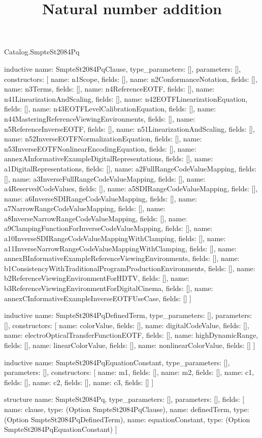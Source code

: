 \begin{lexlean}{Catalog.SmpteSt2084Pq}
\title{Natural number addition}
\begin{semanticmodule}
inductive{
  name: SmpteSt2084PqClause,
  type_parameters: [],
  parameters: [],
  constructors: [
    {name: n1Scope, fields: []},
    {name: n2ConformanceNotation, fields: []},
    {name: n3Terms, fields: []},
    {name: n4ReferenceEOTF, fields: []},
    {name: n41LinearizationAndScaling, fields: []},
    {name: n42EOTFLinearizationEquation, fields: []},
    {name: n43EOTFLevelCalibrationEquation, fields: []},
    {name: n44MasteringReferenceViewingEnvironments, fields: []},
    {name: n5ReferenceInverseEOTF, fields: []},
    {name: n51LinearizationAndScaling, fields: []},
    {name: n52InverseEOTFNormalizationEquation, fields: []},
    {name: n53InverseEOTFNonlinearEncodingEquation, fields: []},
    {name: annexAInformativeExampleDigitalRepresentations, fields: []},
    {name: a1DigitalRepresentations, fields: []},
    {name: a2FullRangeCodeValueMapping, fields: []},
    {name: a3InverseFullRangeCodeValueMapping, fields: []},
    {name: a4ReservedCodeValues, fields: []},
    {name: a5SDIRangeCodeValueMapping, fields: []},
    {name: a6InverseSDIRangeCodeValueMapping, fields: []},
    {name: a7NarrowRangeCodeValueMapping, fields: []},
    {name: a8InverseNarrowRangeCodeValueMapping, fields: []},
    {name: a9ClampingFunctionForInverseCodeValueMapping, fields: []},
    {name: a10InverseSDIRangeCodeValueMappingWithClamping, fields: []},
    {name: a11InverseNarrowRangeCodeValueMappingWithClamping, fields: []},
    {name: annexBInformativeExampleReferenceViewingEnvironments, fields: []},
    {name: b1ConsistencyWithTraditionalProgramProductionEnvironments, fields: []},
    {name: b2ReferenceViewingEnvironmentForHDTV, fields: []},
    {name: b3ReferenceViewingEnvironmentForDigitalCinema, fields: []},
    {name: annexCInformativeExampleInverseEOTFUseCase, fields: []}
  ]
}

inductive{
  name: SmpteSt2084PqDefinedTerm,
  type_parameters: [],
  parameters: [],
  constructors: [
    {name: colorValue, fields: []},
    {name: digitalCodeValue, fields: []},
    {name: electroOpticalTransferFunctionEOTF, fields: []},
    {name: highDynamicRange, fields: []},
    {name: linearColorValue, fields: []},
    {name: nonlinearColorValue, fields: []}
  ]
}

inductive{
  name: SmpteSt2084PqEquationConstant,
  type_parameters: [],
  parameters: [],
  constructors: [
    {name: m1, fields: []},
    {name: m2, fields: []},
    {name: c1, fields: []},
    {name: c2, fields: []},
    {name: c3, fields: []}
  ]
}

structure{
  name: SmpteSt2084Pq,
  type_parameters: [],
  parameters: [],
  fields: [
    {name: clause, type: (Option SmpteSt2084PqClause)},
    {name: definedTerm, type: (Option SmpteSt2084PqDefinedTerm)},
    {name: equationConstant, type: (Option SmpteSt2084PqEquationConstant)}
  ]
}
\end{semanticmodule}
\end{lexlean}

